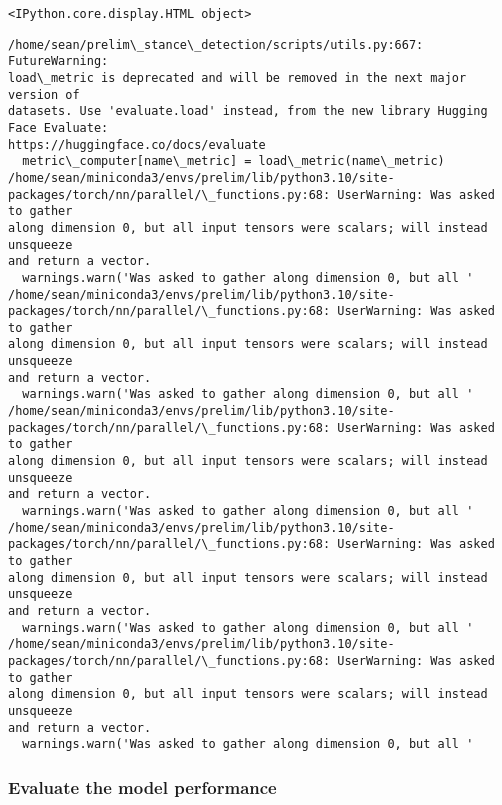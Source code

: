 \documentclass[11pt]{article}
\begin{document}
    
    \begin{Verbatim}[commandchars=\\\{\}]
<IPython.core.display.HTML object>
    \end{Verbatim}

    
    \begin{Verbatim}[commandchars=\\\{\}]
/home/sean/prelim\_stance\_detection/scripts/utils.py:667: FutureWarning:
load\_metric is deprecated and will be removed in the next major version of
datasets. Use 'evaluate.load' instead, from the new library Hugging Face Evaluate:
https://huggingface.co/docs/evaluate
  metric\_computer[name\_metric] = load\_metric(name\_metric)
/home/sean/miniconda3/envs/prelim/lib/python3.10/site-
packages/torch/nn/parallel/\_functions.py:68: UserWarning: Was asked to gather
along dimension 0, but all input tensors were scalars; will instead unsqueeze
and return a vector.
  warnings.warn('Was asked to gather along dimension 0, but all '
/home/sean/miniconda3/envs/prelim/lib/python3.10/site-
packages/torch/nn/parallel/\_functions.py:68: UserWarning: Was asked to gather
along dimension 0, but all input tensors were scalars; will instead unsqueeze
and return a vector.
  warnings.warn('Was asked to gather along dimension 0, but all '
/home/sean/miniconda3/envs/prelim/lib/python3.10/site-
packages/torch/nn/parallel/\_functions.py:68: UserWarning: Was asked to gather
along dimension 0, but all input tensors were scalars; will instead unsqueeze
and return a vector.
  warnings.warn('Was asked to gather along dimension 0, but all '
/home/sean/miniconda3/envs/prelim/lib/python3.10/site-
packages/torch/nn/parallel/\_functions.py:68: UserWarning: Was asked to gather
along dimension 0, but all input tensors were scalars; will instead unsqueeze
and return a vector.
  warnings.warn('Was asked to gather along dimension 0, but all '
/home/sean/miniconda3/envs/prelim/lib/python3.10/site-
packages/torch/nn/parallel/\_functions.py:68: UserWarning: Was asked to gather
along dimension 0, but all input tensors were scalars; will instead unsqueeze
and return a vector.
  warnings.warn('Was asked to gather along dimension 0, but all '
    \end{Verbatim}

    \hypertarget{evaluate-the-model-performance}{%
\subsubsection{Evaluate the model
performance}\label{evaluate-the-model-performance}}
\end{document}
